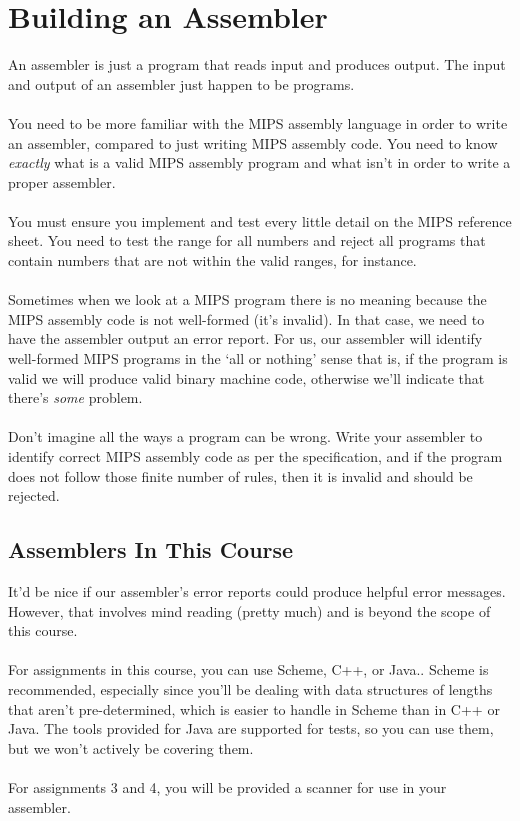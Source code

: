 \documentclass[]{article}
\theoremstyle{definition}
\newcommand{\lecture}[1]{\marginpar{{\footnotesize $\leftarrow$ \underline{#1}}}}
\begin{document}
	\section{Building an Assembler} \lecture{January 21, 2013}
		An assembler is just a program that reads input and produces output. The input and output of an assembler just happen to be programs.
		\\ \\
		You need to be more familiar with the MIPS assembly language in order to write an assembler, compared to just writing MIPS assembly code. You need to know \emph{exactly} what is a valid MIPS assembly program and what isn't in order to write a proper assembler.
		\\ \\
		You must ensure you implement and test every little detail on the MIPS reference sheet. You need to test the range for all numbers and reject all programs that contain numbers that are not within the valid ranges, for instance.
		\\ \\
		Sometimes when we look at a MIPS program there is no meaning because the MIPS assembly code is not well-formed (it's invalid). In that case, we need to have the assembler output an error report. For us, our assembler will identify well-formed MIPS programs in the `all or nothing' sense \textendash{} that is, if the program is valid we will produce valid binary machine code, otherwise we'll indicate that there's \emph{some} problem.
		\\ \\
		Don't imagine all the ways a program can be wrong. Write your assembler to identify correct MIPS assembly code as per the specification, and if the program does not follow those finite number of rules, then it is invalid and should be rejected.
		
		\subsection{Assemblers In This Course}
			It'd be nice if our assembler's error reports could produce helpful error messages. However, that involves mind reading (pretty much) and is beyond the scope of this course.
			\\ \\
			For assignments in this course, you can use Scheme, C++, or Java.. Scheme is recommended, especially since you'll be dealing with data structures of lengths that aren't pre-determined, which is easier to handle in Scheme than in C++ or Java. The tools provided for Java are supported for tests, so you can use them, but we won't actively be covering them.
			\\ \\
			For assignments 3 and 4, you will be provided a scanner for use in your assembler.
\end{document}
